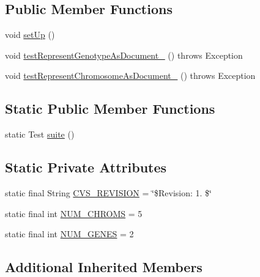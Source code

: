 \subsection*{Public Member Functions}
\begin{DoxyCompactItemize}
\item 
void \hyperlink{classorg_1_1jgap_1_1data_1_1_data_tree_builder_test_a17e227ae90814cd60fedc366c6ec3af4}{set\-Up} ()
\item 
void \hyperlink{classorg_1_1jgap_1_1data_1_1_data_tree_builder_test_af45a4095716ce8083c850d469e7f7b55}{test\-Represent\-Genotype\-As\-Document\-\_} ()  throws Exception 
\item 
void \hyperlink{classorg_1_1jgap_1_1data_1_1_data_tree_builder_test_a3d5c0711247c6ea2c4c32e46c3f1b383}{test\-Represent\-Chromosome\-As\-Document\-\_} ()  throws Exception 
\end{DoxyCompactItemize}
\subsection*{Static Public Member Functions}
\begin{DoxyCompactItemize}
\item 
static Test \hyperlink{classorg_1_1jgap_1_1data_1_1_data_tree_builder_test_acdac36713838b42fbf8184a47847b557}{suite} ()
\end{DoxyCompactItemize}
\subsection*{Static Private Attributes}
\begin{DoxyCompactItemize}
\item 
static final String \hyperlink{classorg_1_1jgap_1_1data_1_1_data_tree_builder_test_aa0655723fe40a4190a32c3d1e79e773c}{C\-V\-S\-\_\-\-R\-E\-V\-I\-S\-I\-O\-N} = \char`\"{}\$Revision\-: 1. \$\char`\"{}
\item 
static final int \hyperlink{classorg_1_1jgap_1_1data_1_1_data_tree_builder_test_a044a27fdc84ec1b3063b48f8894a79f4}{N\-U\-M\-\_\-\-C\-H\-R\-O\-M\-S} = 5
\item 
static final int \hyperlink{classorg_1_1jgap_1_1data_1_1_data_tree_builder_test_a4e22d9af8e2f651acebeb91c55ea7f66}{N\-U\-M\-\_\-\-G\-E\-N\-E\-S} = 2
\end{DoxyCompactItemize}
\subsection*{Additional Inherited Members}



